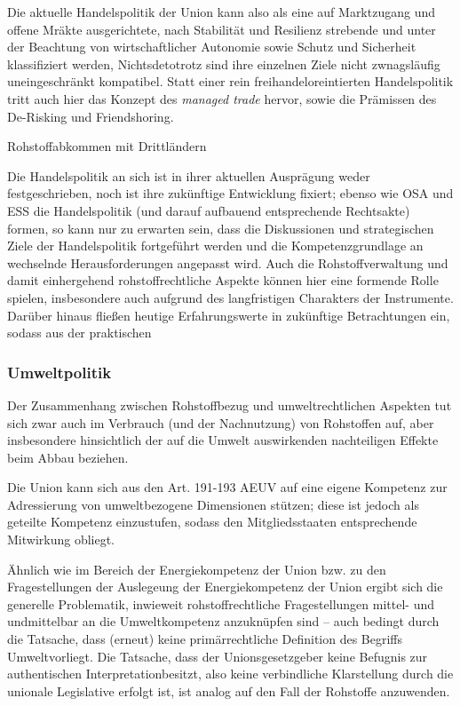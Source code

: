\documentclass[12pt,a4paper,oneside]{book} %
\begin{document}
Die aktuelle Handelspolitik der Union kann also als eine auf Marktzugang und offene Mräkte ausgerichtete, nach Stabilität und Resilienz strebende und unter der Beachtung von wirtschaftlicher Autonomie sowie Schutz und Sicherheit klassifiziert werden,\autocite{RdTW 2024, 216} Nichtsdetotrotz sind ihre einzelnen Ziele nicht zwnagsläufig uneingeschränkt kompatibel.\autocite{RdTW 2024, 206} Statt einer rein freihandeloreintierten Handelspolitik tritt auch hier das Konzept des \textit{managed trade} hervor, sowie die Prämissen des De-Risking und Friendshoring.
	
	
Rohstoffabkommen mit Drittländern

Die Handelspolitik an sich ist in ihrer aktuellen Ausprägung weder festgeschrieben, noch ist ihre zukünftige Entwicklung fixiert; ebenso wie OSA und ESS die Handelspolitik (und darauf aufbauend entsprechende Rechtsakte) formen, so kann nur zu erwarten sein, dass die Diskussionen und strategischen Ziele der Handelspolitik fortgeführt werden und die Kompetenzgrundlage an wechselnde Herausforderungen angepasst wird. Auch die Rohstoffverwaltung und damit einhergehend rohstoffrechtliche Aspekte können hier eine formende Rolle spielen, insbesondere auch aufgrund des langfristigen Charakters der Instrumente. Darüber hinaus fließen heutige Erfahrungswerte in zukünftige Betrachtungen ein, sodass aus der praktischen 
	
	
\subsubsection{Umweltpolitik}
Der Zusammenhang zwischen Rohstoffbezug und umweltrechtlichen Aspekten tut sich zwar auch im Verbrauch (und der Nachnutzung) von Rohstoffen auf, aber insbesondere hinsichtlich der auf die Umwelt auswirkenden nachteiligen Effekte beim Abbau beziehen.

Die Union kann sich aus den Art. 191-193 AEUV auf eine eigene Kompetenz zur Adressierung von umweltbezogene Dimensionen stützen; diese ist jedoch als geteilte Kompetenz einzustufen, sodass den Mitgliedsstaaten entsprechende Mitwirkung obliegt.
	
Ähnlich wie im Bereich der Energiekompetenz der Union bzw. zu den Fragestellungen der Auslegeung der Energiekompetenz der Union ergibt sich die generelle Problematik, inwieweit rohstoffrechtliche Fragestellungen mittel- und undmittelbar an die Umweltkompetenz anzuknüpfen sind -- auch bedingt durch die Tatsache, dass (erneut) keine primärrechtliche Definition des Begriffs \glqq Umwelt\grqq vorliegt. Die Tatsache, dass der Unionsgesetzgeber \glqq keine Befugnis zur authentischen Interpretation\grqq besitzt,\autocite{Grabitz Hilf Nettesheim, Art. 191 Rn. 49} also keine verbindliche Klarstellung durch die unionale Legislative erfolgt ist,  ist analog auf den Fall der Rohstoffe anzuwenden.
	
\end{document}
